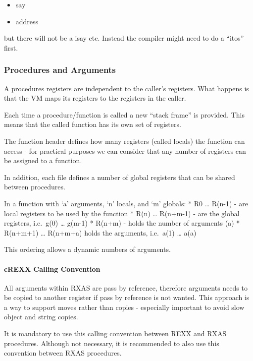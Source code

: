 \begin{itemize}
\tightlist
\item
  say
\item
  address
\end{itemize}

but there will not be a isay etc. Instead the compiler might need to do
a ``itos'' first.

\hypertarget{procedures-and-arguments}{%
\subsubsection{Procedures and
Arguments}\label{procedures-and-arguments}}

A procedures registers are independent to the caller's registers. What
happens is that the VM maps its registers to the registers in the
caller.

Each time a procedure/function is called a new ``stack frame'' is
provided. This means that the called function has its own set of
registers.

The function header defines how many registers (called locals) the
function can access - for practical purposes we can consider that any
number of registers can be assigned to a function.

In addition, each file defines a number of global registers that can be
shared between procedures.

In a function with `a' arguments, `n' locals, and `m' globals: * R0
\ldots{} R(n-1) - are local registers to be used by the function * R(n)
\ldots{} R(n+m-1) - are the global registers, i.e.~g(0) \ldots{} g(m-1)
* R(n+m) - holds the number of arguments (a) * R(n+m+1) \ldots{}
R(n+m+a) holds the arguments, i.e.~a(1) \ldots{} a(a)

This ordering allows a dynamic numbers of arguments.

\hypertarget{crexx-calling-convention}{%
\paragraph{cREXX Calling Convention}\label{crexx-calling-convention}}

All arguments within RXAS are pass by reference, therefore arguments
needs to be copied to another register if pass by reference is not
wanted. This approach is a way to support moves rather than copies -
especially important to avoid slow object and string copies.

It is mandatory to use this calling convention between REXX and RXAS
procedures. Although not necessary, it is recommended to also use this
convention between RXAS procedures.

